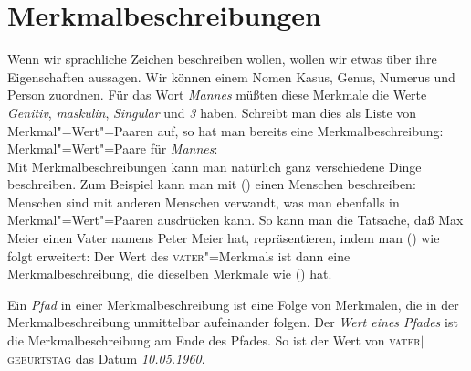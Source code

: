 \section{Merkmalbeschreibungen}

Wenn wir sprachliche Zeichen beschreiben wollen, wollen wir etwas über ihre Eigenschaften
aussagen. Wir können \zb einem Nomen Kasus, Genus, Numerus und Person zuordnen. Für das
Wort \emph{Mannes} müßten diese Merkmale die Werte \emph{Genitiv}, \emph{maskulin}, \emph{Singular} und \emph{3} haben.
Schreibt man dies als Liste von Merkmal"=Wert"=Paaren auf, so hat man bereits eine Merkmalbeschreibung:
\ea
Merkmal"=Wert"=Paare für \emph{Mannes}:\\
\z
Mit Merkmalbeschreibungen kann man natürlich ganz verschiedene Dinge beschreiben. Zum Beispiel kann
man mit () einen Menschen beschreiben:
\ea
{}
\z
Menschen sind mit anderen Menschen verwandt, was man ebenfalls in Merkmal"=Wert"=Paaren
ausdrücken kann. So kann man \zb die Tatsache, daß Max Meier einen Vater namens Peter
Meier hat, repräsentieren, indem man () wie folgt erweitert:
\ea
{}
\z
Der Wert des \textsc{vater}"=Merkmals ist dann eine Merkmalbeschreibung, die dieselben Merkmale
wie () hat.

Ein \emph{Pfad} in einer Merkmalbeschreibung ist eine Folge von Merkmalen, 
die in der Merkmalbeschreibung unmittelbar aufeinander folgen.
Der \emph{Wert eines Pfades} ist die Merkmalbeschreibung am Ende des Pfades. So ist
der Wert von \textsc{vater$|$geburtstag} das Datum \emph{10.05.1960}.

